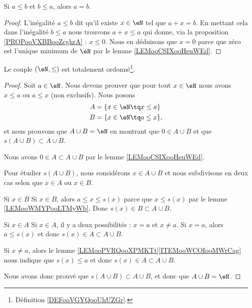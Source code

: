 \begin{lemma}       \label{LEMooJRZKooOMhOkH}
    Si \( a\leq b\) et \( b\leq a\), alors \( a=b\).
\end{lemma}

\begin{proof}
    L'inégalité \( a\leq b\) dit qu'il existe \( x\in \eN\) tel que \( a+x=b\). En mettant cela dans l'inégalité \( b\leq a\) nous trouvons \( a+x\leq a\) qui donne, via la proposition \ref{PROPooVXBBooZcghrA} : \( x\leq 0\). Nous en déduisons que \( x=0\) parce que zéro est l'unique minimum de \( \eN\) par le lemme \ref{LEMooCSIXooHeuWEd}.
\end{proof}

\begin{proposition}     \label{PROPooGCCRooFBYrlo}
    Le couple \( (\eN,\leq)\) est totalement ordonné\footnote{Définition \ref{DEFooVGYQooUhUZGr}.}.
\end{proposition}

\begin{proof}
    Soit \( a\in \eN\). Nous devons prouver que pour tout \( x\in \eN\) nous avons \( x\leq a\) ou \( a\leq x\) (non exclusifs). Nous posons
    \begin{subequations}
        \begin{align}
            A&=\{ x\in \eN\tq x\leq a \}\\
            B&=\{ x\in \eN\tq a\leq x \},
        \end{align}
    \end{subequations}
    et nous prouvons que \( A\cup B=\eN\) en montrant que \( 0\in A\cup B\) et que \( s(A\cup B)\subset A\cup B\).

    Nous avons \( 0\in A\subset A\cup B\) par le lemme \ref{LEMooCSIXooHeuWEd}.

    Pour étudier \( s(A\cup B)\), nous considérons \( x\in A\cup B\) et nous subdivisons en deux cas selon que \( x\in A\) ou \( x\in B\).

    \begin{subproof}
    \item[Si \( x\in B\)]
    Si \( x\in B\), alors \( a\leq x\leq s(x)\) parce que \( x\leq s(x)\) par le lemme \ref{LEMooWMYPooLTMyWb}. Donc \( s(x)\in B\subset A\cup B\).
    \item[Si \( x\in A\)]
    Si \( x\in A\), il y a deux possibilités : \( x=a\) et \( x\neq a\). Si \( x=a\), alors \( a\leq s(x)\) et donc \( s(x)\in A\subset A\cup B\).

    Si \( x\neq a\), alors le lemme \ref{LEMooPVRQooXPMKTt}\ref{ITEMooWCOIooMWrCag} nous indique que \( s(x)\leq a\) et donc \( s(x)\in A\subset A\cup B\).
    \end{subproof}
    Nous avons donc prouvé que \( s(A\cup B)\subset A\cup B\), et donc que \( A\cup B=\eN\).
\end{proof}


